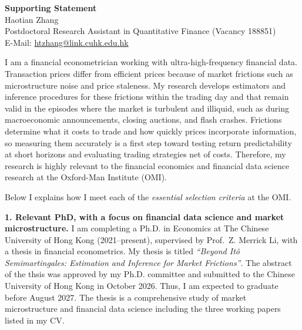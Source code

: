 \documentclass[12pt,a4paper]{article}
\begin{document}
\begin{center}
    {\LARGE \textbf{Supporting Statement}} \\ \vspace{5pt}
    {\large Haotian Zhang} \\ \vspace{5pt}
    Postdoctoral Research Assistant in Quantitative Finance (Vacancy 188851) \\ \vspace{3pt}
    E-Mail: \url{htzhang@link.cuhk.edu.hk}
\end{center}

I am a financial econometrician working with ultra-high-frequency financial data. 
Transaction prices differ from efficient prices because of market frictions
such as microstructure noise and price staleness.
My research develops estimators and inference procedures for 
these frictions within the trading day 
and that remain valid in the episodes where 
the market is turbulent and illiquid, such as during 
macroeconomic announcements, closing auctions, and flash crashes. 
Frictions determine what it costs to trade 
and how quickly prices incorporate information,
so measuring them accurately is a first step toward testing return predictability
at short horizons and evaluating trading strategies net of costs. 
Therefore, my research is highly relevant to the financial economics and financial data science research 
at the Oxford-Man Institute (OMI).

Below I explains how I meet each of the \textit{essential selection criteria}
at the OMI.

\textbf{1. Relevant PhD, with a focus on financial data science and market microstructure.}
I am completing a Ph.D. in Economics at The Chinese University of Hong Kong (2021--present),
supervised by Prof.~Z. Merrick Li, with a thesis in financial econometrics. 
My thesis is titled \textit{``Beyond Itô Semimartingales:
Estimation and Inference for Market Frictions''}. 
The abstract of the thsis was approved by my Ph.D. committee 
and submitted to the Chinese University of Hong Kong in October 2026. 
Thus, I am expected to graduate before August 2027. 
The thesis is a comprehensive study of market microstructure and financial data science 
including the three working papers listed in my CV. 
\end{document}
